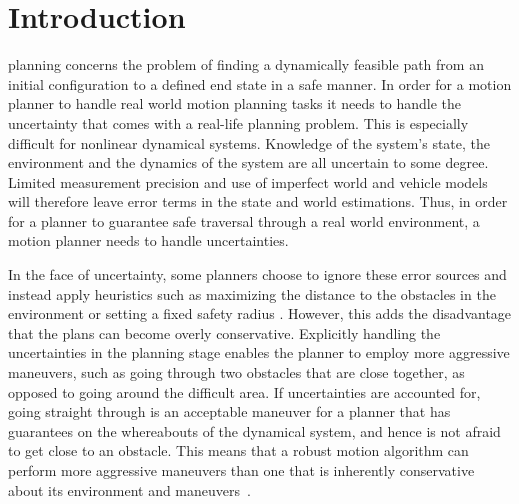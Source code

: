 
\section{Introduction}
 planning concerns the problem of finding a dynamically
feasible path from an initial configuration to a defined end state in a safe
manner. In order for a motion planner to handle real world motion planning tasks
it needs to handle the uncertainty that comes with a real-life planning problem.
This is especially difficult for nonlinear dynamical systems. Knowledge of the
system's state, the environment and the dynamics of the system are all uncertain
to some degree. Limited measurement precision and use of imperfect world and
vehicle models will therefore leave error terms in the state and world
estimations. Thus, in order for a planner to guarantee safe traversal through a
real world environment, a motion planner needs to handle uncertainties.

In the face of uncertainty, some planners choose to ignore these error sources
and instead apply heuristics such as maximizing the distance to the obstacles in
the environment or setting a fixed safety radius
\cite{Hoy2015ClutteredEnvironmentSurvey}. However, this adds the disadvantage
that the plans can become overly conservative. Explicitly handling the
uncertainties in the planning stage enables the planner to employ more
aggressive maneuvers, such as going through two obstacles that are close
together, as opposed to going around the difficult area. If uncertainties are
accounted for, going straight through is an acceptable maneuver for a planner
that has guarantees on the whereabouts of the dynamical system, and hence is not
afraid to get close to an obstacle. This means that a robust motion algorithm
can perform more aggressive maneuvers than one that is inherently conservative
about its environment and maneuvers~\cite{singhRobustOnlineMotion2017}.




%


